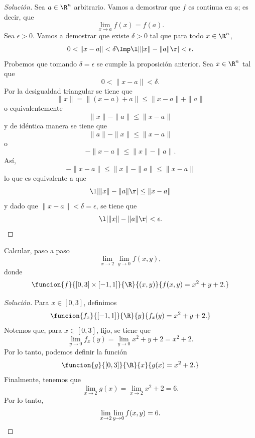 \documentclass[a4,11pt]{aleph-notas}
\begin{document}
\begin{proof}[Solución]
Sea $a\in\R^n$ arbitrario. Vamos a demostrar que $f$ es continua en $a$; es decir, que
	\[
		\lim_{x\to a}f(x)=f(a).
	\]
	Sea $\epsilon>0$. Vamos a demostrar que existe $\delta>0$ tal que para todo $x\in\R^n$,
	\[
		0<\|x-a\|<\delta \Imp \l|\|x\|-\|a\|\r|<\epsilon.
	\]
	Probemos que tomando $\delta =\epsilon$ se cumple la proposición anterior. Sea $x\in\R^n$ tal que
	\[
		0<\|x-a\|<\delta.
	\]
	Por la desigualdad triangular se tiene que
	\[
		\|x\|=\|(x-a)+a\|\leq\|x-a\|+\|a\|
	\]
	o equivalentemente 
	\[
		\|x\|-\|a\|\leq \|x-a\|
	\]
	y de idéntica manera se tiene que
	\[
		\|a\|-\|x\|\leq \|x-a\|
	\]
	o
	\[
		-\|x-a\|\leq \|x\|-\|a\|.
	\]
	Así,
	\[
		-\|x-a\|\leq \|x\|-\|a\|\leq \|x-a\|
	\]
	lo que es equivalente a que
	\[
		\l|\|x\|-\|a\|\r|\leq \|x-a\|
	\]
	y dado que $\|x-a\|<\delta=\epsilon$, se tiene que
	\[
		\l|\|x\|-\|a\|\r|<\epsilon.
	\]
\end{proof}

\begin{ejer}
Calcular, paso a paso
    \[
        \lim_{x\to 2}\lim_{y\to 0}f(x,y),
    \]
    donde
    \[
        \funcion{f}{[0,3]\times[-1,1]}{\R}
        {(x,y)}{f(x,y)=x^2+y+2.}
    \]
\end{ejer}

\begin{proof}[Solución]
Para $x\in [0,3]$, definimos
    \[
        \funcion{f_x}{[-1,1]}{\R}{y}{f_x(y)=x^2+y+2.}
    \]
    Notemos que, para $x\in[0,3]$, fijo, se tiene que
    \[
        \lim_{y\to 0}f_x(y)=\lim_{y\to 0}x^2+y+2=x^2+2.
    \]
    Por lo tanto, podemos definir la función
    \[
        \funcion{g}{[0,3]}{\R}{x}{g(x)=x^2+2.}
    \]
    Finalmente, tenemos que
    \[
        \lim_{x\to 2}g(x)=\lim_{x\to 2}x^2+2=6.
    \]
    Por lo tanto,
    \[
        \lim_{x\to 2}\lim_{y\to 0}f(x,y) = 6.\qedhere
    \]
\end{proof}
\end{document}

